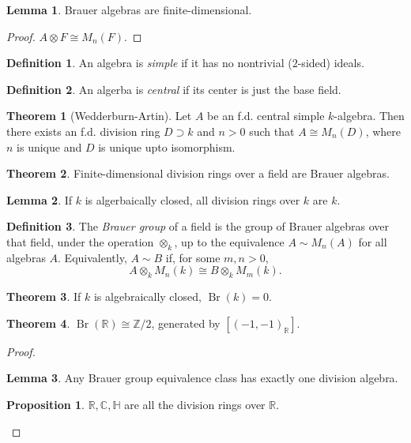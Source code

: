 \documentclass{article}
\newcommand{\C}{\mathbb C}
\newcommand{\Z}{\mathbb Z}
\newcommand{\R}{\mathbb R}
\newcommand{\HH}{\mathbb H}
\DeclareMathOperator{\Br}{Br}
\theoremstyle{definition}
\newtheorem*{lem}{Lemma}
\newtheorem*{prop}{Proposition}
\newtheorem*{thm}{Theorem}
\newtheorem*{defn}{Definition}
\begin{document}
\begin{lem}
 Brauer algebras are finite-dimensional. 
\end{lem}
\begin{proof}
 $A\otimes F\cong M_n(F)$.
\end{proof}

\begin{defn}
  An algebra is \textit{simple} if it has no nontrivial ($2$-sided) ideals.
\end{defn}
\begin{defn}
 An algerba is \textit{central} if its center is just the base field. 
\end{defn}

\begin{thm}[Wedderburn-Artin]
  Let $A$ be an f.d. central simple $k$-algebra. Then there exists an f.d.
  division ring $D\supset k$ and $n>0$ such that $A\cong M_n(D)$, where $n$ is
  unique and $D$ is unique upto isomorphism.  
\end{thm}

\begin{thm}
 Finite-dimensional division rings over a field are Brauer algebras. 
\end{thm}


\begin{lem}
 If $k$ is algerbaically closed, all division rings over $k$ are $k$.
\end{lem}

\begin{defn}
 The \textit{Brauer group} of a field is the group of Brauer algebras over that
 field, under the operation $\otimes_k$,
 up to the equivalence $A\sim M_n(A)$ for all algebras $A$. Equivalently,
 $A\sim B$ if, for some $m,n>0$,
 $$A\otimes_k M_n(k)\cong B\otimes_kM_m(k).$$
\end{defn}

\begin{thm}
  If $k$ is algebraically closed, $\Br(k) = 0$.
\end{thm} 

\begin{thm}
 $\Br(\R)\cong\Z/2$, generated by $[(-1,-1)_\R]$. 
\end{thm}

\begin{proof}
  \begin{lem}
   Any Brauer group equivalence class has exactly one division algebra. 
  \end{lem}
  \begin{prop}
    $\R, \C,\HH $ are all the division rings over $\R$.
  \end{prop}
\end{proof}
\end{document}
